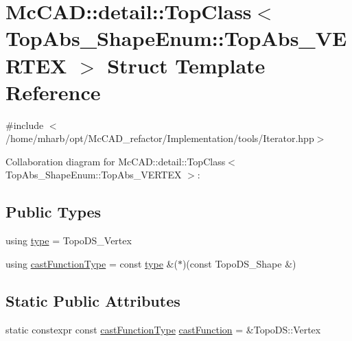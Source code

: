 \hypertarget{structMcCAD_1_1detail_1_1TopClass_3_01TopAbs__ShapeEnum_1_1TopAbs__VERTEX_01_4}{}\section{Mc\+C\+AD\+:\+:detail\+:\+:Top\+Class$<$ Top\+Abs\+\_\+\+Shape\+Enum\+:\+:Top\+Abs\+\_\+\+V\+E\+R\+T\+EX $>$ Struct Template Reference}
\label{structMcCAD_1_1detail_1_1TopClass_3_01TopAbs__ShapeEnum_1_1TopAbs__VERTEX_01_4}


{\ttfamily \#include $<$/home/mharb/opt/\+Mc\+C\+A\+D\+\_\+refactor/\+Implementation/tools/\+Iterator.\+hpp$>$}



Collaboration diagram for Mc\+C\+AD\+:\+:detail\+:\+:Top\+Class$<$ Top\+Abs\+\_\+\+Shape\+Enum\+:\+:Top\+Abs\+\_\+\+V\+E\+R\+T\+EX $>$\+:
\subsection*{Public Types}
\begin{DoxyCompactItemize}
\item 
using \hyperlink{structMcCAD_1_1detail_1_1TopClass_3_01TopAbs__ShapeEnum_1_1TopAbs__VERTEX_01_4_aac4ac574e4238dedde2ba199faa49518}{type} = Topo\+D\+S\+\_\+\+Vertex
\item 
using \hyperlink{structMcCAD_1_1detail_1_1TopClass_3_01TopAbs__ShapeEnum_1_1TopAbs__VERTEX_01_4_a5a1721f062076980de404b50886a4a90}{cast\+Function\+Type} = const \hyperlink{structMcCAD_1_1detail_1_1TopClass_3_01TopAbs__ShapeEnum_1_1TopAbs__VERTEX_01_4_aac4ac574e4238dedde2ba199faa49518}{type} \&($\ast$)(const Topo\+D\+S\+\_\+\+Shape \&)
\end{DoxyCompactItemize}
\subsection*{Static Public Attributes}
\begin{DoxyCompactItemize}
\item 
static constexpr const \hyperlink{structMcCAD_1_1detail_1_1TopClass_3_01TopAbs__ShapeEnum_1_1TopAbs__VERTEX_01_4_a5a1721f062076980de404b50886a4a90}{cast\+Function\+Type} \hyperlink{structMcCAD_1_1detail_1_1TopClass_3_01TopAbs__ShapeEnum_1_1TopAbs__VERTEX_01_4_a91675bb0f17780a9f57d434c0ed393ec}{cast\+Function} = \&Topo\+D\+S\+::\+Vertex
\end{DoxyCompactItemize}


